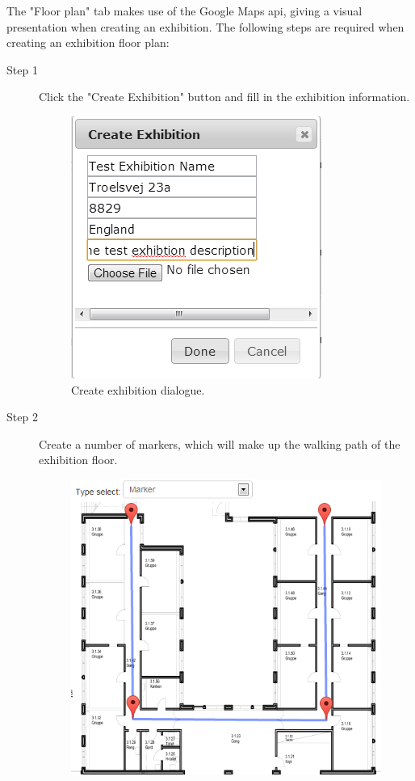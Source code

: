 The "Floor plan" tab makes use of the Google Maps \ac{api}, giving a visual presentation when creating an exhibition.
The following steps are required when creating an exhibition floor plan:
\begin{description}
	\item[Step 1] Click the "Create Exhibition" button and fill in the exhibition information.
	\begin{figure}[H]
		\centering
		\includegraphics[scale=0.5]{img/website/step2.png}
		\caption{Create exhibition dialogue.\label{fig:websitestep1}}
	\end{figure}
	\item[Step 2] Create a number of markers, which will make up the walking path of the exhibition floor.
	\begin{figure}[H]
		\centering
		\includegraphics[scale=0.5]{img/website/step3.png}

\end{figure}
\end{description}

